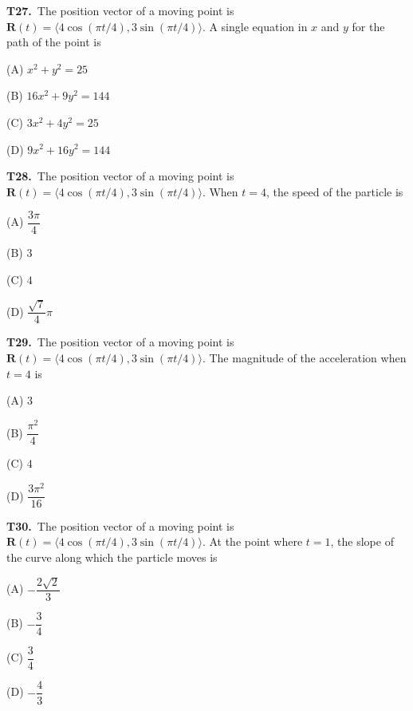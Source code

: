 \documentclass[11pt]{article}
\begin{document}
\bigskip\noindent\textbf{T27.}\ The position vector of a moving point is $\mathbf R(t)=\langle4\cos(\pi t/4),3\sin(\pi t/4)\rangle$. A single equation in $x$ and $y$ for the path of the point is
\begin{list}{}{\setlength{\leftmargin}{3em}\setlength{\labelwidth}{2.5em}\setlength{\itemsep}{0pt}\setlength{\topsep}{2pt}}
\item[(A)] $x^2+y^2=25$
\item[(B)] $16x^2+9y^2=144$
\item[(C)] $3x^2+4y^2=25$
\item[(D)] $9x^2+16y^2=144$
\end{list}

\bigskip\noindent\textbf{T28.}\ The position vector of a moving point is $\mathbf R(t)=\langle4\cos(\pi t/4),3\sin(\pi t/4)\rangle$. When $t=4$, the speed of the particle is
\begin{list}{}{\setlength{\leftmargin}{3em}\setlength{\labelwidth}{2.5em}\setlength{\itemsep}{0pt}\setlength{\topsep}{2pt}}
\item[(A)] $\dfrac{3\pi}{4}$
\item[(B)] $3$
\item[(C)] $4$
\item[(D)] $\dfrac{\sqrt{7}}{4}\pi$
\end{list}

\bigskip\noindent\textbf{T29.}\ The position vector of a moving point is $\mathbf R(t)=\langle4\cos(\pi t/4),3\sin(\pi t/4)\rangle$. The magnitude of the acceleration when $t=4$ is
\begin{list}{}{\setlength{\leftmargin}{3em}\setlength{\labelwidth}{2.5em}\setlength{\itemsep}{0pt}\setlength{\topsep}{2pt}}
\item[(A)] $3$
\item[(B)] $\dfrac{\pi^2}{4}$
\item[(C)] $4$
\item[(D)] $\dfrac{3\pi^2}{16}$
\end{list}

\bigskip\noindent\textbf{T30.}\ The position vector of a moving point is $\mathbf R(t)=\langle4\cos(\pi t/4),3\sin(\pi t/4)\rangle$. At the point where $t=1$, the slope of the curve along which the particle moves is
\begin{list}{}{\setlength{\leftmargin}{3em}\setlength{\labelwidth}{2.5em}\setlength{\itemsep}{0pt}\setlength{\topsep}{2pt}}
\item[(A)] $-\dfrac{2\sqrt{2}}{3}$
\item[(B)] $-\dfrac{3}{4}$
\item[(C)] $\dfrac{3}{4}$
\item[(D)] $-\dfrac{4}{3}$
\end{list}
\end{document}
